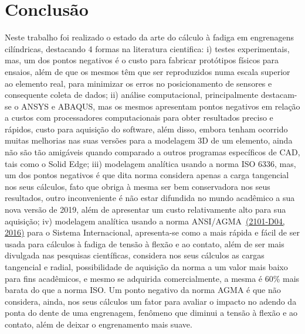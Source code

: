 \documentclass[12pt,a4paper]{article}
\begin{document}
\section*{Conclusão}

{\label{conclusuxe3o}}

Neste trabalho foi realizado o estado da arte do cálculo à fadiga em
engrenagens cilíndricas, destacando 4 formas na literatura cientifica:
i) testes experimentais, mas, um dos pontos negativos é o custo para
fabricar protótipos físicos para ensaios, além de que os mesmos têm que
ser reproduzidos numa escala superior ao elemento real, para minimizar
os erros no posicionamento de sensores e consequente coleta de dados;
ii) análise computacional, principalmente destacam-se o ANSYS e ABAQUS,
mas os mesmos apresentam pontos negativos em relação a custos com
processadores computacionais para obter resultados preciso e rápidos,
custo para aquisição do software, além disso, embora tenham ocorrido
muitas melhorias nas suas versões para a modelagem 3D de um elemento,
ainda não são tão amigáveis quando comparado a outros programas
específicos de CAD, tais como o Solid Edge; iii) modelagem analítica
usando a norma ISO 6336, mas, um dos pontos negativos é que dita norma
considera apenas a carga tangencial nos seus cálculos, fato que obriga à
mesma ser bem conservadora nos seus resultados, outro inconveniente é
não estar difundida no mundo acadêmico a sua nova versão de 2019, além
de apresentar um custo relativamente alto para sua aquisição; iv)
modelagem analítica usando a norma ANSI/AGMA~\hyperref[csl:5]{(2101-D04, 2016)} para o
Sistema Internacional, apresenta-se como a mais rápida e fácil de ser
usada para cálculos à fadiga de tensão à flexão e ao contato, além de
ser mais divulgada nas pesquisas científicas, considera nos seus
cálculos as cargas tangencial e radial, possibilidade de aquisição da
norma a um valor mais baixo para fins acadêmicos, e mesmo se adquirida
comercialmente, a mesma é 60\% mais barata do que a norma ISO. Um ponto
negativo da norma AGMA é que não considera, ainda, nos seus cálculos um
fator para avaliar o impacto no adendo da ponta do dente de uma
engrenagem, fenômeno que diminui a tensão à flexão e ao contato, além de
deixar o engrenamento mais suave.
\end{document}
